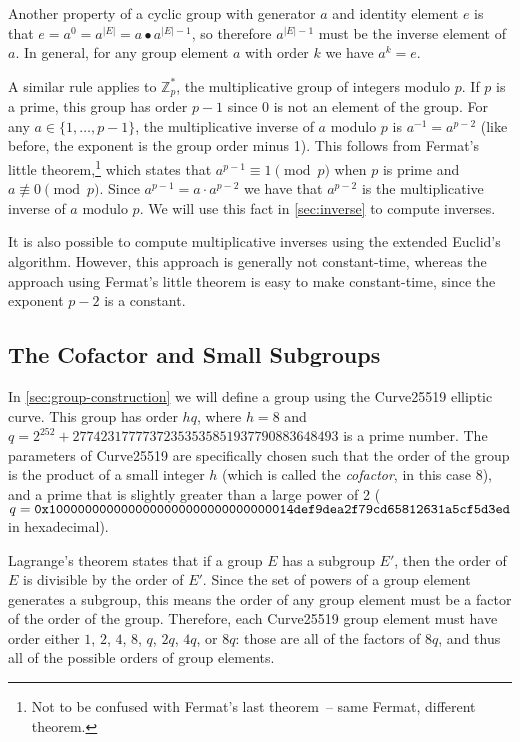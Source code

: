 \documentclass{article}
\begin{document}
Another property of a cyclic group with generator $a$ and identity element $e$ is that $e = a^0 = a^{|E|} = a \bullet a^{|E|-1}$, so therefore $a^{|E|-1}$ must be the inverse element of $a$.
In general, for any group element $a$ with order $k$ we have $a^k = e$.

A similar rule applies to $\mathbb{Z}_p^*$, the multiplicative group of integers modulo $p$.
If $p$ is a prime, this group has order $p-1$ since 0 is not an element of the group.
For any $a \in \{1, \dots, p-1\}$, the multiplicative inverse of $a$ modulo $p$ is $a^{-1} = a^{p-2}$ (like before, the exponent is the group order minus 1).
This follows from Fermat's little theorem,\footnote{Not to be confused with Fermat's last theorem~-- same Fermat, different theorem.} which states that $a^{p-1} \equiv 1 \pmod{p}$ when $p$ is prime and $a \not\equiv 0 \pmod{p}$.
Since $a^{p-1} = a \cdot a^{p-2}$ we have that $a^{p-2}$ is the multiplicative inverse of $a$ modulo $p$.
We will use this fact in \autoref{sec:inverse} to compute inverses.

It is also possible to compute multiplicative inverses using the extended Euclid's algorithm.
However, this approach is generally not constant-time, whereas the approach using Fermat's little theorem is easy to make constant-time, since the exponent $p-2$ is a constant.

\subsection{The Cofactor and Small Subgroups}\label{sec:cofactor}

In \autoref{sec:group-construction} we will define a group using the Curve25519 elliptic curve.
This group has order $hq$, where $h=8$ and $q = 2^{252} + 27742317777372353535851937790883648493$ is a prime number.
The parameters of Curve25519 are specifically chosen such that the order of the group is the product of a small integer $h$ (which is called the \emph{cofactor}, in this case 8), and a prime that is slightly greater than a large power of 2 ($q = \verb|0x1000000000000000000000000000000014def9dea2f79cd65812631a5cf5d3ed|$ in hexadecimal).

Lagrange's theorem states that if a group $E$ has a subgroup $E'$, then the order of $E$ is divisible by the order of $E'$.
Since the set of powers of a group element generates a subgroup, this means the order of any group element must be a factor of the order of the group.
Therefore, each Curve25519 group element must have order either $1$, $2$, $4$, $8$, $q$, $2q$, $4q$, or $8q$: those are all of the factors of $8q$, and thus all of the possible orders of group elements.
\end{document}
